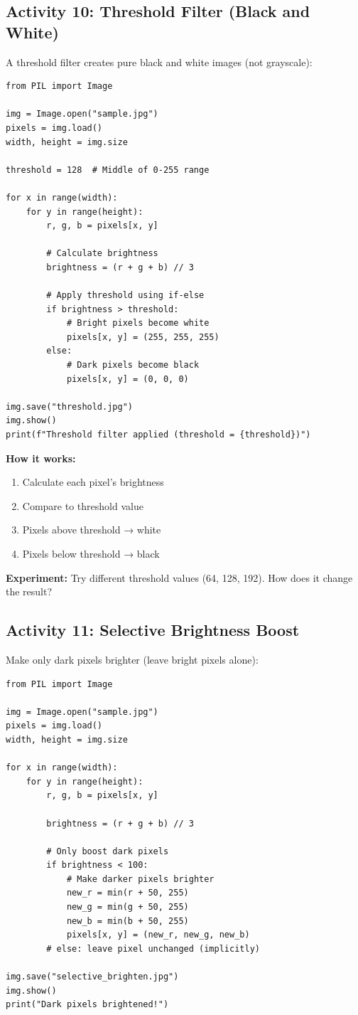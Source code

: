 \documentclass[11pt]{article}
\begin{document}
\subsection*{Activity 10: Threshold Filter (Black and White)}

A threshold filter creates pure black and white images (not grayscale):

\begin{lstlisting}
from PIL import Image

img = Image.open("sample.jpg")
pixels = img.load()
width, height = img.size

threshold = 128  # Middle of 0-255 range

for x in range(width):
    for y in range(height):
        r, g, b = pixels[x, y]

        # Calculate brightness
        brightness = (r + g + b) // 3

        # Apply threshold using if-else
        if brightness > threshold:
            # Bright pixels become white
            pixels[x, y] = (255, 255, 255)
        else:
            # Dark pixels become black
            pixels[x, y] = (0, 0, 0)

img.save("threshold.jpg")
img.show()
print(f"Threshold filter applied (threshold = {threshold})")
\end{lstlisting}

\textbf{How it works:}
\begin{enumerate}
    \item Calculate each pixel's brightness
    \item Compare to threshold value
    \item Pixels above threshold → white
    \item Pixels below threshold → black
\end{enumerate}

\textbf{Experiment:} Try different threshold values (64, 128, 192). How does it change the result?

\subsection*{Activity 11: Selective Brightness Boost}

Make only dark pixels brighter (leave bright pixels alone):

\begin{lstlisting}
from PIL import Image

img = Image.open("sample.jpg")
pixels = img.load()
width, height = img.size

for x in range(width):
    for y in range(height):
        r, g, b = pixels[x, y]

        brightness = (r + g + b) // 3

        # Only boost dark pixels
        if brightness < 100:
            # Make darker pixels brighter
            new_r = min(r + 50, 255)
            new_g = min(g + 50, 255)
            new_b = min(b + 50, 255)
            pixels[x, y] = (new_r, new_g, new_b)
        # else: leave pixel unchanged (implicitly)

img.save("selective_brighten.jpg")
img.show()
print("Dark pixels brightened!")
\end{lstlisting}
\end{document}
